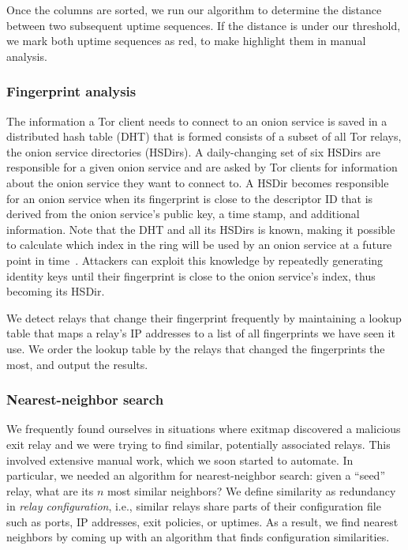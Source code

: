 Once the columns are sorted, we run our algorithm to determine the distance
between two subsequent uptime sequences.  If the distance is under our
threshold, we mark both uptime sequences as red, to make highlight them in
manual analysis.

\subsubsection{Fingerprint analysis}
\label{sec:fingerprint-analysis}
The information a Tor client needs to connect to an onion service is saved in a
distributed hash table (DHT) that is formed consists of a subset of all Tor
relays, the onion service directories (HSDirs).  A daily-changing set of six
HSDirs are responsible for a given onion service and are asked by Tor clients
for information about the onion service they want to connect to.  A HSDir
becomes responsible for an onion service when its fingerprint is close to the
descriptor ID that is derived from the onion service's public key, a time stamp,
and additional information.
Note that the DHT and all its HSDirs is known, making it possible to calculate
which index in the ring will be used by an onion service at a future point in
time~\cite{Biryukov2013a}.  Attackers can exploit this knowledge by repeatedly
generating identity keys until their fingerprint is close to the onion service's
index, thus becoming its HSDir.

We detect relays that change their fingerprint frequently by maintaining a
lookup table that maps a relay's IP addresses to a list of all fingerprints we
have seen it use.  We order the lookup table by the relays that changed the
fingerprints the most, and output the results.

\subsubsection{Nearest-neighbor search}
\label{sec:nearest-neighbor}
We frequently found ourselves in situations where exitmap discovered a malicious
exit relay and we were trying to find similar, potentially associated relays.
This involved extensive manual work, which we soon started to automate.  In
particular, we needed an algorithm for nearest-neighbor search: given a ``seed''
relay, what are its $n$ most similar neighbors?  We define similarity as
redundancy in \emph{relay configuration}, i.e., similar relays share parts of
their configuration file such as ports, IP addresses, exit policies, or uptimes.
As a result, we find nearest neighbors by coming up with an algorithm that finds
configuration similarities.


